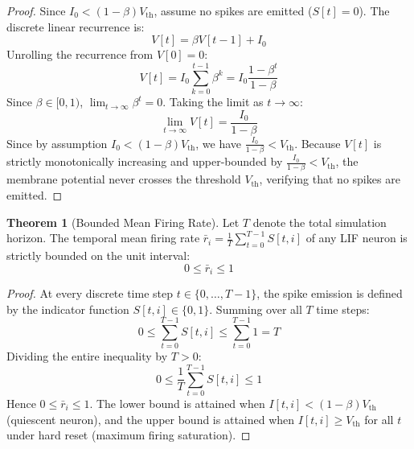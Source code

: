 \documentclass[11pt,a4paper]{article}
\theoremstyle{definition}
\newtheorem{theorem}{\textbf{Theorem}}[section]
\begin{document}
\begin{proof}
Since $I_0 < (1 - \beta) V_{\text{th}}$, assume no spikes are emitted ($S[t] = 0$).
The discrete linear recurrence is:
{\boldmath
\begin{equation}
V[t] = \beta V[t-1] + I_0
\end{equation}
}
Unrolling the recurrence from $V[0] = 0$:
{\boldmath
\begin{equation}
V[t] = I_0 \sum_{k=0}^{t-1} \beta^k = I_0 \frac{1 - \beta^t}{1 - \beta}
\end{equation}
}
Since $\beta \in [0, 1)$, $\lim_{t \to \infty} \beta^t = 0$.
Taking the limit as $t \to \infty$:
{\boldmath
\begin{equation}
\lim_{t \to \infty} V[t] = \frac{I_0}{1 - \beta}
\end{equation}
}
Since by assumption $I_0 < (1 - \beta) V_{\text{th}}$, we have $\frac{I_0}{1 - \beta} < V_{\text{th}}$.
Because $V[t]$ is strictly monotonically increasing and upper-bounded by $\frac{I_0}{1 - \beta} < V_{\text{th}}$, the membrane potential never crosses the threshold $V_{\text{th}}$, verifying that no spikes are emitted.
\end{proof}

\begin{theorem}[Bounded Mean Firing Rate]
Let $T$ denote the total simulation horizon. The temporal mean firing rate $\bar{r}_i = \frac{1}{T} \sum_{t=0}^{T-1} S[t, i]$ of any LIF neuron is strictly bounded on the unit interval:
{\boldmath
\begin{equation}
0 \le \bar{r}_i \le 1
\end{equation}
}
\end{theorem}

\begin{proof}
At every discrete time step $t \in \{0, \dots, T-1\}$, the spike emission is defined by the indicator function $S[t, i] \in \{0, 1\}$.
Summing over all $T$ time steps:
{\boldmath
\begin{equation}
0 \le \sum_{t=0}^{T-1} S[t, i] \le \sum_{t=0}^{T-1} 1 = T
\end{equation}
}
Dividing the entire inequality by $T > 0$:
{\boldmath
\begin{equation}
0 \le \frac{1}{T} \sum_{t=0}^{T-1} S[t, i] \le 1
\end{equation}
}
Hence $0 \le \bar{r}_i \le 1$.
The lower bound is attained when $I[t, i] < (1-\beta)V_{\text{th}}$ (quiescent neuron), and the upper bound is attained when $I[t, i] \ge V_{\text{th}}$ for all $t$ under hard reset (maximum firing saturation).
\end{proof}
\end{document}
